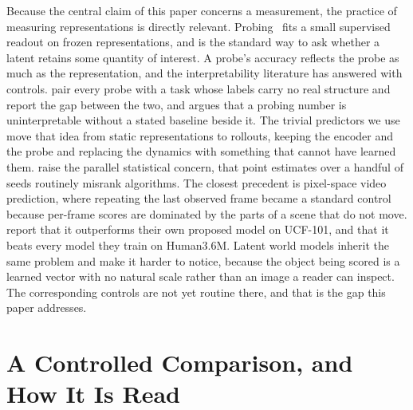 \documentclass[10pt]{article} %
\begin{document}
Because the central claim of this paper concerns a measurement, the practice of measuring representations is directly relevant. Probing~\citep{alain2016understanding} fits a small supervised readout on frozen representations, and is the standard way to ask whether a latent retains some quantity of interest. A probe's accuracy reflects the probe as much as the representation, and the interpretability literature has answered with controls. \citet{Hewitt2019ControlTasks} pair every probe with a task whose labels carry no real structure and report the gap between the two, and \citet{Belinkov2022Probing} argues that a probing number is uninterpretable without a stated baseline beside it. The trivial predictors we use move that idea from static representations to rollouts, keeping the encoder and the probe and replacing the dynamics with something that cannot have learned them. \citet{Agarwal2021Precipice} raise the parallel statistical concern, that point estimates over a handful of seeds routinely misrank algorithms. The closest precedent is pixel-space video prediction, where repeating the last observed frame became a standard control because per-frame scores are dominated by the parts of a scene that do not move. \citet{Villegas2017MCnet} report that it outperforms their own proposed model on UCF-101, and \citet{Villegas2019HighFidelity} that it beats every model they train on Human3.6M. Latent world models inherit the same problem and make it harder to notice, because the object being scored is a learned vector with no natural scale rather than an image a reader can inspect. The corresponding controls are not yet routine there, and that is the gap this paper addresses.

\section{A Controlled Comparison, and How It Is Read}
\label{sec:arch}
\end{document}
